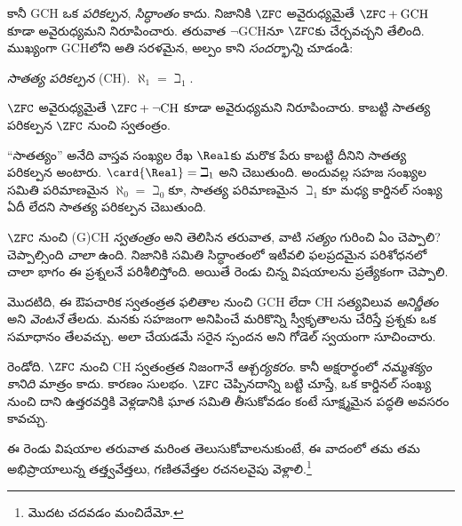 \documentclass[../../../include/open-logic-section]{subfiles}
\begin{document}
కానీ GCH ఒక \emph{పరికల్పన}, \emph{సిద్ధాంతం} కాదు. నిజానికి $\ZFC$ అవైరుధ్యమైతే $\ZFC + \text{GCH}$ కూడా అవైరుధ్యమని \citet{Godel1938} నిరూపించారు. తరువాత $\lnot$GCHనూ $\ZFC$కు చేర్చవచ్చని తేలింది. ముఖ్యంగా GCHలోని అతి సరళమైన, అల్పం కాని \emph{సందర్భాన్ని} చూడండి:

\begin{defish}
\emph{సాతత్య పరికల్పన} (CH). $\aleph_1 = \beth_1$.
\end{defish}

$\ZFC$ అవైరుధ్యమైతే $\ZFC
+ \lnot\text{CH}$ కూడా అవైరుధ్యమని \citet{Cohen1963} నిరూపించారు. కాబట్టి సాతత్య పరికల్పన $\ZFC$ నుంచి స్వతంత్రం.

``సాతత్యం'' అనేది వాస్తవ సంఖ్యల రేఖ $\Real$కు మరొక పేరు కాబట్టి దీనిని సాతత్య పరికల్పన అంటారు. $\card{\Real} =
\beth_1$ అని  చెబుతుంది. అందువల్ల సహజ సంఖ్యల సమితి పరిమాణమైన $\aleph_0 = \beth_0$కూ, సాతత్య పరిమాణమైన $\beth_1$కూ మధ్య కార్డినల్ సంఖ్య ఏదీ లేదని సాతత్య పరికల్పన చెబుతుంది.

$\ZFC$ నుంచి (G)CH \emph{స్వతంత్రం} అని తెలిసిన తరువాత, వాటి \emph{సత్యం} గురించి ఏం చెప్పాలి? చెప్పాల్సింది \emph{చాలా} ఉంది. నిజానికి సమితి సిద్ధాంతంలో ఇటీవలి ఫలప్రదమైన పరిశోధనలో చాలా భాగం ఈ ప్రశ్నలనే పరిశీలిస్తోంది. అయితే రెండు చిన్న విషయాలను ప్రత్యేకంగా చెప్పాలి.

మొదటిది, ఈ ఔపచారిక స్వతంత్రత ఫలితాల నుంచి
GCH లేదా CH సత్యవిలువ \emph{అనిర్ణీతం} అని
\emph{వెంటనే} తేలదు. మనకు సహజంగా అనిపించే మరికొన్ని
స్వీకృతాలను చేరిస్తే ప్రశ్నకు ఒక సమాధానం తేలవచ్చు.
అలా చేయడమే సరైన స్పందన అని గోడెల్ స్వయంగా సూచించారు.

రెండోది. $\ZFC$ నుంచి CH స్వతంత్రత నిజంగానే \emph{ఆశ్చర్యకరం}. కానీ అక్షరార్థంలో \emph{నమ్మశక్యం కానిది} మాత్రం కాదు. కారణం సులభం. $\ZFC$ చెప్పినదాన్ని బట్టి చూస్తే, ఒక కార్డినల్ సంఖ్య నుంచి దాని ఉత్తరవర్తికి వెళ్లడానికి ఘాత సమితి తీసుకోవడం కంటే సూక్ష్మమైన పద్ధతి అవసరం కావచ్చు.

ఈ రెండు విషయాల తరువాత మరింత తెలుసుకోవాలనుకుంటే, ఈ వాదంలో తమ తమ అభిప్రాయాలున్న తత్త్వవేత్తలు, గణితవేత్తల రచనలవైపు వెళ్లాలి.\footnote{మొదట \citet[\S15.6]{Potter2004} చదవడం మంచిదేమో.}
\end{document}
